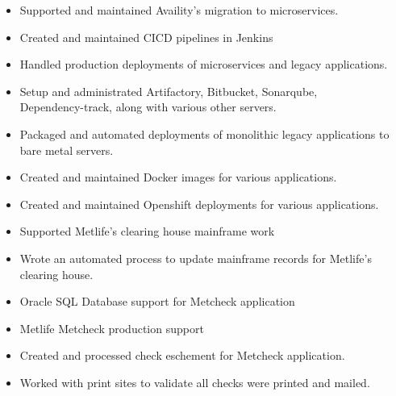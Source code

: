 \documentclass[10pt,a4paper,ragged2e,withhyper]{altacv}
\begin{document}
\begin{paracol}{2}

\begin{itemize}
\item Supported and maintained Availity's migration to microservices.
\item Created and maintained CICD pipelines in Jenkins
\item Handled production deployments of microservices and legacy applications.
\item Setup and administrated Artifactory, Bitbucket, Sonarqube, \\Dependency-track, along with various other servers. 
\item Packaged and automated deployments of monolithic legacy applications to bare metal servers.
\item Created and maintained Docker images for various applications.
\item Created and maintained Openshift deployments for various applications.
\end{itemize}

\divider

\begin{itemize}
\item Supported Metlife's clearing house mainframe work
\item Wrote an automated process to update mainframe records for Metlife's clearing house. 
\item Oracle SQL Database support for Metcheck application
\item Metlife Metcheck production support
\item Created and processed check eschement for Metcheck application.
\item Worked with print sites to validate all checks were printed and mailed. 
\end{itemize}

%
%
%


\end{paracol}
\end{document}
